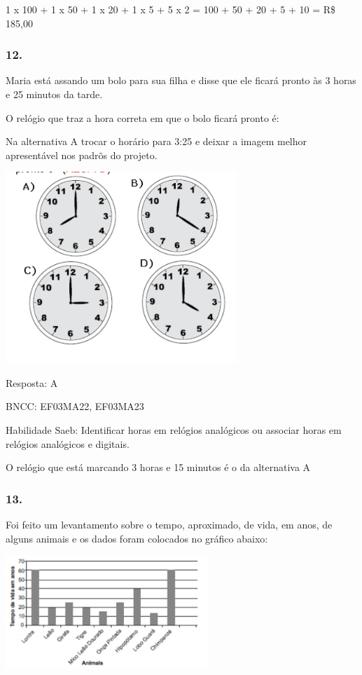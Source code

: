 1 x 100 + 1 x 50 + 1 x 20 + 1 x 5 + 5 x 2 = 100 + 50 + 20 + 5 + 10 = R\$
185,00

\subsubsection{12.}\label{section-167}

Maria está assando um bolo para sua filha e disse que ele ficará pronto
às 3 horas e 25 minutos da tarde.

O relógio que traz a hora correta em que o bolo ficará pronto é:

Na alternativa A trocar o horário para 3:25 e deixar a imagem melhor
apresentável nos padrõs do projeto.

\includegraphics[width=3.44197in,height=2.84191in]{media/image126.png}

Resposta: A

BNCC: EF03MA22, EF03MA23

Habilidade Saeb: Identificar horas em relógios analógicos ou associar
horas em relógios analógicos e digitais.

O relógio que está marcando 3 horas e 15 minutos é o da alternativa A

\subsubsection{13.}\label{section-168}

Foi feito um levantamento sobre o tempo, aproximado, de vida, em anos,
de alguns animais e os dados foram colocados no gráfico abaixo:

\includegraphics[width=3.02451in,height=1.70004in]{media/image127.png}

